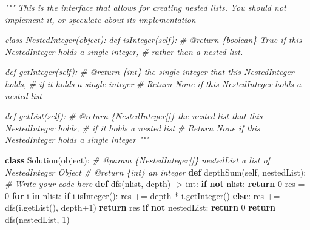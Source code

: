 \documentclass[
]{article}
\newenvironment{Shaded}{}{}
\newcommand{\BuiltInTok}[1]{#1}
\newcommand{\CommentTok}[1]{\textcolor[rgb]{0.38,0.63,0.69}{\textit{#1}}}
\newcommand{\ControlFlowTok}[1]{\textcolor[rgb]{0.00,0.44,0.13}{\textbf{#1}}}
\newcommand{\DecValTok}[1]{\textcolor[rgb]{0.25,0.63,0.44}{#1}}
\newcommand{\KeywordTok}[1]{\textcolor[rgb]{0.00,0.44,0.13}{\textbf{#1}}}
\newcommand{\NormalTok}[1]{#1}
\newcommand{\OperatorTok}[1]{\textcolor[rgb]{0.40,0.40,0.40}{#1}}
\newcommand{\VariableTok}[1]{\textcolor[rgb]{0.10,0.09,0.49}{#1}}
\begin{document}
\begin{Shaded}
\begin{Highlighting}[]
\CommentTok{"""}
\CommentTok{This is the interface that allows for creating nested lists.}
\CommentTok{You should not implement it, or speculate about its implementation}

\CommentTok{class NestedInteger(object):}
\CommentTok{    def isInteger(self):}
\CommentTok{        \# @return \{boolean\} True if this NestedInteger holds a single integer,}
\CommentTok{        \# rather than a nested list.}

\CommentTok{    def getInteger(self):}
\CommentTok{        \# @return \{int\} the single integer that this NestedInteger holds,}
\CommentTok{        \# if it holds a single integer}
\CommentTok{        \# Return None if this NestedInteger holds a nested list}

\CommentTok{    def getList(self):}
\CommentTok{        \# @return \{NestedInteger[]\} the nested list that this NestedInteger holds,}
\CommentTok{        \# if it holds a nested list}
\CommentTok{        \# Return None if this NestedInteger holds a single integer}
\CommentTok{"""}


\KeywordTok{class}\NormalTok{ Solution(}\BuiltInTok{object}\NormalTok{):}
    \CommentTok{\# @param \{NestedInteger[]\} nestedList a list of NestedInteger Object}
    \CommentTok{\# @return \{int\} an integer}
    \KeywordTok{def}\NormalTok{ depthSum(}\VariableTok{self}\NormalTok{, nestedList):}
        \CommentTok{\# Write your code here}
        \KeywordTok{def}\NormalTok{ dfs(nlist, depth) }\OperatorTok{{-}\textgreater{}} \BuiltInTok{int}\NormalTok{:}
            \ControlFlowTok{if} \KeywordTok{not}\NormalTok{ nlist:}
                \ControlFlowTok{return} \DecValTok{0}
\NormalTok{            res }\OperatorTok{=} \DecValTok{0}
            \ControlFlowTok{for}\NormalTok{ i }\KeywordTok{in}\NormalTok{ nlist:}
                \ControlFlowTok{if}\NormalTok{ i.isInteger():}
\NormalTok{                    res }\OperatorTok{+=}\NormalTok{ depth }\OperatorTok{*}\NormalTok{ i.getInteger()}
                \ControlFlowTok{else}\NormalTok{:}
\NormalTok{                    res }\OperatorTok{+=}\NormalTok{ dfs(i.getList(), depth}\OperatorTok{+}\DecValTok{1}\NormalTok{)}
            \ControlFlowTok{return}\NormalTok{ res}
        \ControlFlowTok{if} \KeywordTok{not}\NormalTok{ nestedList:}
            \ControlFlowTok{return} \DecValTok{0}
        \ControlFlowTok{return}\NormalTok{ dfs(nestedList, }\DecValTok{1}\NormalTok{)}
\end{Highlighting}
\end{Shaded}
\end{document}
